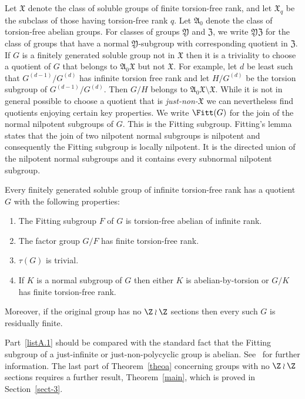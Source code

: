 Let $\mathfrak X$ denote the class of soluble groups of finite torsion-free rank, and let $\mathfrak X_q$ be the subclass of those having torsion-free rank $q$. Let $\mathfrak A_0$ denote the class of torsion-free abelian groups. For classes of groups $\mathfrak Y$ and $\mathfrak Z$, we write $\mathfrak{YZ}$ for the class of groups that have a normal $\mathfrak Y$-subgroup with corresponding quotient in $\mathfrak Z$. If $G$ is a finitely generated soluble group not in $\mathfrak X$ then it is a triviality to choose a quotient of $G$ that belongs to $\mathfrak A_0\mathfrak X$ but not $\mathfrak X$. For example, let $d$ be least such that $G^{(d-1)}/G^{(d)}$ has infinite torsion free rank and let $H/G^{(d)}$ be the torsion subgroup of $G^{(d-1)}/G^{(d)}$. Then $G/H$ belongs to $\mathfrak A_0\mathfrak X\setminus\mathfrak X$. While it is not in general possible to choose a quotient that is \emph{just-non-$\mathfrak X$} we can nevertheless find quotients enjoying certain key properties. We write $\Fitt(G)$ for the join of the normal nilpotent subgroups of $G$. This is the Fitting subgroup. Fitting's lemma states that the join of two nilpotent normal subgroups is nilpotent and consequently the Fitting subgroup is locally nilpotent. It is the directed union of the nilpotent normal subgroups and it contains every subnormal nilpotent subgroup.
\setcounter{theor}{0}
\begin{theor}\label{theoa}
Every finitely generated soluble group of infinite torsion-free rank has a quotient $G$ with the following properties:
\begin{enumerate}\romanenumi
\item \label{listA.1}The Fitting subgroup $F$ of $G$ is torsion-free abelian of infinite rank.
\item \label{listA.2}The factor group $G/F$ has finite torsion-free rank.
\item \label{listA.3}$\tau(G)$ is trivial.
\item \label{listA.4}If $K$ is a normal subgroup of $G$ then either $K$ is abelian-by-torsion or $G/K$ has finite torsion-free rank.
\end{enumerate}
Moreover, if the original group has no $\Z\wr\Z$ sections then every such $G$ is residually finite.
\end{theor}

Part~\eqref{listA.1} should be compared with the standard fact that the Fitting subgroup of a just-infinite or just-non-polycyclic group is abelian. See~\cite{RW} for further information. The last part of Theorem~\ref{theoa} concerning groups with no $\Z\wr\Z$ sections requires a further result, Theorem~\ref{main}, which is proved in Section~\ref{sect-3}.

